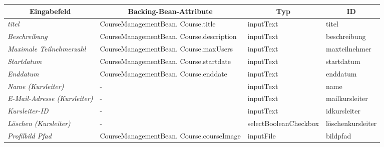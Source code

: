 \begin{itemize}
\begin{center}
\begin{longtable}{|p{3cm} |p{5cm} | p{4cm}|p{3cm}|}
						\hline \multicolumn{1}{|c|}{\textbf{Eingabefeld}} & \multicolumn{1}{|c|}{\textbf{Backing-Bean-Attribute}} & \multicolumn{1}{|c|}{\textbf{Typ}}  &  \multicolumn{1}{|c|}{\textbf{ID}} \\ \hline
						\endfirsthead
						\hline
						\endlastfoot
						\textit{titel} & CourseManagementBean. Course.title & inputText & titel \\ \hline
						\textit{Beschreibung} & CourseManagementBean. Course.description & inputText & beschreibung \\ \hline
						\textit{Maximale Teilnehmerzahl} & CourseManagementBean. Course.maxUsers & inputText & maxteilnehmer \\ \hline
						\textit{Startdatum} & CourseManagementBean. Course.startdate & inputText & startdatum \\ \hline
						\textit{Enddatum} & CourseManagementBean. Course.enddate & inputText & enddatum \\ \hline
						\textit{Name (Kursleiter)} & - & inputText & name \\ \hline
						\textit{E-Mail-Adresse (Kursleiter)} & - & inputText & mailkursleiter \\ \hline
						\textit{Kursleiter-ID} & - & inputText & idkursleiter \\ \hline
						\textit{Löschen (Kursleiter)} & - & selectBooleanCheckbox & löschenkursleiter \\ \hline
						\textit{Profilbild Pfad} & CourseManagementBean. Course.courseImage & inputFile & bildpfad \\ \hline
					\end{longtable}
				\end{center}
				
				\begin{center}
					\begin{longtable}{|p{3cm} |p{8cm} | p{5cm}|}
						

\end{longtable}
\end{center}
\end{itemize}
